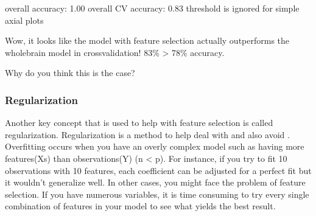 \documentclass[letterpaper,10pt,english]{sphinxmanual}
\begin{document}
\begin{sphinxVerbatim}[commandchars=\\\{\}]
  \PYG{p}{[}\PYG{p}{[}\PYG{p}{]}\PYG{p}{]}
  

       
\end{sphinxVerbatim}

\begin{sphinxVerbatim}[commandchars=\\\{\}]
overall accuracy: 1.00
overall CV accuracy: 0.83
threshold is ignored for simple axial plots
\end{sphinxVerbatim}

\noindent{}

\noindent{}

Wow, it looks like the model with feature selection actually outperforms the whole\sphinxhyphen{}brain model in cross\sphinxhyphen{}validation! 83\% \textgreater{} 78\% accuracy.

Why do you think this is the case?


\subsubsection{Regularization}
\label{\detokenize{content/Multivariate_Prediction:regularization}}
Another key concept that is used to help with feature selection is called regularization. Regularization is a method to help deal with  and also avoid . Overfitting occurs when you have an overly complex model such as having more features(Xs) than observations(Y) (n \textless{} p). For instance, if you try to fit 10 observations with 10 features, each coefficient can be adjusted for a perfect fit but it wouldn’t generalize well. In other cases, you might face the problem of feature selection. If you have numerous variables, it is time consuming to try every single combination of features in your model to see what yields the best result.
\end{document}
